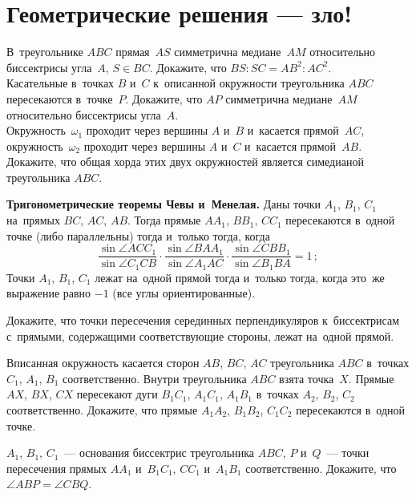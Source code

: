 
\section*{Геометрические решения --- зло!}


\begin{problems}

\item
\sp
В~треугольнике $ABC$ прямая~$AS$ симметрична медиане~$AM$ относительно
биссектрисы угла~$A$, $S \in BC$.
Докажите, что $BS : SC = AB^2 : AC^2$.
\\
\sp
Касательные в~точках $B$ и~$C$ к~описанной окружности треугольника $ABC$
пересекаются в~точке~$P$.
Докажите, что $AP$ симметрична медиане~$AM$ относительно биссектрисы угла~$A$.
\\
\sp
Окружность~$\omega_1$ проходит через вершины $A$ и~$B$ и~касается прямой~$AC$,
окружность~$\omega_2$ проходит через вершины $A$ и~$C$ и~касается прямой~$AB$.
Докажите, что общая хорда этих двух окружностей является симедианой
треугольника $ABC$.

\item\textbf{Тригонометрические теоремы Чевы и~Менелая.}
Даны точки $A_1$, $B_1$, $C_1$ на~прямых $BC$, $AC$, $AB$.
Тогда прямые $A A_1$, $B B_1$, $C C_1$ пересекаются в~одной точке
(либо параллельны) тогда и~только тогда, когда
\[
    \frac{\sin \angle A C C_1}{\sin \angle C_1 C B}
    \cdot
    \frac{\sin \angle B A A_1}{\sin \angle A_1 A C}
    \cdot
    \frac{\sin \angle C B B_1}{\sin \angle B_1 B A}
=
    1
\,;\]
Точки $A_1$, $B_1$, $C_1$ лежат на~одной прямой тогда и~только тогда, когда
это~же выражение равно $-1$ (все углы ориентированные).

\item
Докажите, что точки пересечения серединных перпендикуляров к~биссектрисам
с~прямыми, содержащими соответствующие стороны, лежат на~одной прямой.

\item
Вписанная окружность касается сторон $AB$, $BC$, $AC$ треугольника $ABC$
в~точках $C_1$, $A_1$, $B_1$ соответственно.
Внутри треугольника $ABC$ взята точка~$X$.
Прямые $AX$, $BX$, $CX$ пересекают дуги $B_1 C_1$, $A_1 C_1$, $A_1 B_1$
в~точках $A_2$, $B_2$, $C_2$ соответственно.
Докажите, что прямые $A_1 A_2$, $B_1 B_2$, $C_1 C_2$ пересекаются в~одной
точке.

\item
$A_1$, $B_1$, $C_1$~--- основания биссектрис треугольника $ABC$,
$P$ и~$Q$~--- точки пересечения прямых $A A_1$ и~$B_1 C_1$, $C C_1$ и~$A_1 B_1$
соответственно.
Докажите, что $\angle ABP = \angle CBQ$.


\end{problems}

